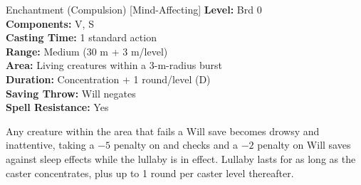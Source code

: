 {Enchantment (Compulsion) [Mind-Affecting]}
{
	\textbf{Level:}
	Brd 0\\
	\textbf{Components:}
	V, S\\
	\textbf{Casting Time:}
	1 standard action\\
	\textbf{Range:}
	Medium (30 m + 3 m/level)\\
	\textbf{Area:}
	Living creatures within a 3-m-radius burst\\
	\textbf{Duration:}
	Concentration + 1 round/level (D)\\
	\textbf{Saving Throw:}
	Will negates\\
	\textbf{Spell Resistance:}
	Yes\\
}
{
	Any creature within the area that fails a Will save becomes drowsy and inattentive, taking a $-5$ penalty on  and  checks and a $-2$ penalty on Will saves against sleep effects while the lullaby is in effect. Lullaby lasts for as long as the caster concentrates, plus up to 1 round per caster level thereafter.

}
